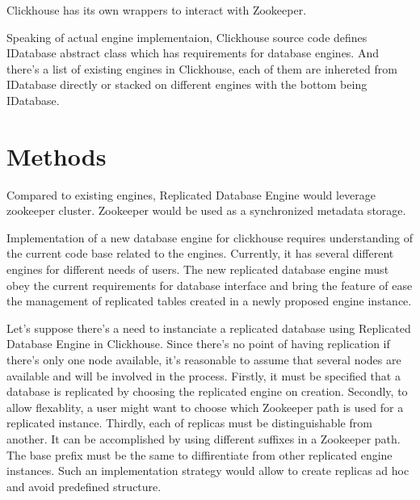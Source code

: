 \documentclass[conference]{IEEEtran}
\begin{document}
Clickhouse has its own wrappers to interact with Zookeeper. %

Speaking of actual engine implementaion, Clickhouse source code\cite{clickhouse}
defines IDatabase abstract class which has
requirements for database engines. And there's a list of existing engines in Clickhouse, each
of them are inhereted from IDatabase directly or stacked on different engines with the %
bottom being IDatabase.

\section{Methods}

Compared to existing engines, Replicated Database Engine
would leverage zookeeper cluster. Zookeeper would be used as a synchronized
metadata storage.

Implementation of a new database engine for clickhouse requires understanding of
the current code base related to the engines. Currently, it has several different
engines for different needs of users. The new replicated database engine must
obey the current requirements for database interface and bring the feature of ease
the management of replicated tables created in a newly proposed engine instance.

Let's suppose there's a need to instanciate a replicated database using
Replicated Database Engine in Clickhouse. Since there's no point of having replication
if there's only one node available, it's reasonable to assume that several nodes are
available and will be involved in the process. Firstly, it must be specified that
a database is replicated by choosing the replicated engine on creation. Secondly,
to allow flexablity, a user might want to choose which Zookeeper path is used for a
replicated instance. Thirdly, each of replicas must be distinguishable from another.
It can be accomplished by using different suffixes in a Zookeeper path. The base prefix
must be the same to diffirentiate from other replicated engine instances.
Such an implementation strategy would allow to create replicas ad hoc and avoid
predefined structure.
\end{document}
